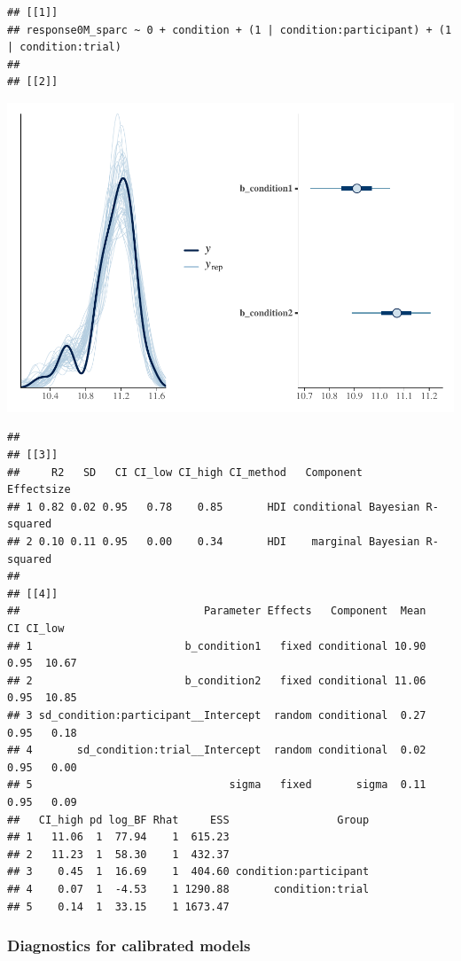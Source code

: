 \documentclass[
]{article}
\begin{document}
\begin{verbatim}
## [[1]]
## response0M_sparc ~ 0 + condition + (1 | condition:participant) + (1 | condition:trial) 
## 
## [[2]]
\end{verbatim}

\includegraphics{08_Publish_GUSO_ASIL_files/figure-latex/Diagnostiics0M-2.pdf}

\begin{verbatim}
## 
## [[3]]
##     R2   SD   CI CI_low CI_high CI_method   Component         Effectsize
## 1 0.82 0.02 0.95   0.78    0.85       HDI conditional Bayesian R-squared
## 2 0.10 0.11 0.95   0.00    0.34       HDI    marginal Bayesian R-squared
## 
## [[4]]
##                             Parameter Effects   Component  Mean   CI CI_low
## 1                        b_condition1   fixed conditional 10.90 0.95  10.67
## 2                        b_condition2   fixed conditional 11.06 0.95  10.85
## 3 sd_condition:participant__Intercept  random conditional  0.27 0.95   0.18
## 4       sd_condition:trial__Intercept  random conditional  0.02 0.95   0.00
## 5                               sigma   fixed       sigma  0.11 0.95   0.09
##   CI_high pd log_BF Rhat     ESS                 Group
## 1   11.06  1  77.94    1  615.23                      
## 2   11.23  1  58.30    1  432.37                      
## 3    0.45  1  16.69    1  404.60 condition:participant
## 4    0.07  1  -4.53    1 1290.88       condition:trial
## 5    0.14  1  33.15    1 1673.47
\end{verbatim}

\hypertarget{diagnostics-for-calibrated-models}{%
\subsubsection{Diagnostics for calibrated
models}\label{diagnostics-for-calibrated-models}}
\end{document}
